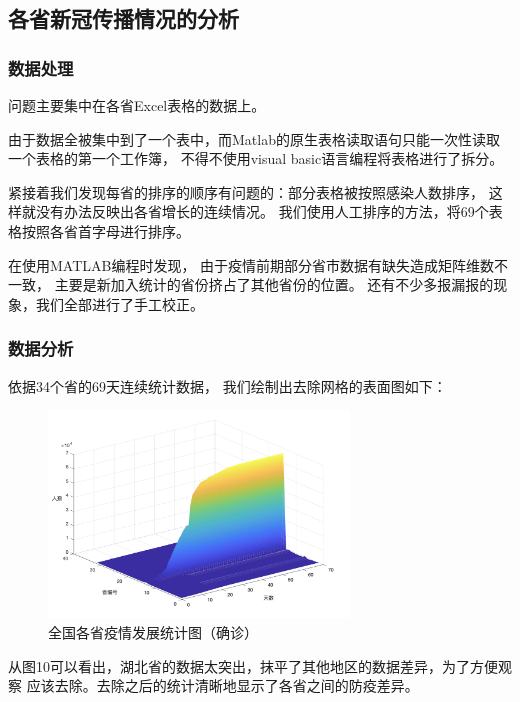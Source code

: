 \documentclass[UTF8]{ctexart}
\begin{document}
\subsection{各省新冠传播情况的分析}
\subsubsection{数据处理}
问题主要集中在各省Excel表格的数据上。
\\
\par 
由于数据全被集中到了一个表中，而Matlab的原生表格读取语句只能一次性读取一个表格的第一个工作簿，
不得不使用visual basic语言编程将表格进行了拆分。

\par 
紧接着我们发现每省的排序的顺序有问题的：部分表格被按照感染人数排序，
这样就没有办法反映出各省增长的连续情况。
我们使用人工排序的方法，将69个表格按照各省首字母进行排序。

\par 
在使用MATLAB编程时发现，
由于疫情前期部分省市数据有缺失造成矩阵维数不一致，
主要是新加入统计的省份挤占了其他省份的位置。
还有不少多报漏报的现象，我们全部进行了手工校正。


\subsubsection{数据分析}
\par 
依据34个省的69天连续统计数据，
我们绘制出去除网格的表面图如下：

\begin{figure}[htbp][H]
\centering
\includegraphics[width=8cm]{11.png} 
\caption{全国各省疫情发展统计图（确诊）}
\end{figure}
\par
从图10可以看出，湖北省的数据太突出，抹平了其他地区的数据差异，为了方便观察
应该去除。去除之后的统计清晰地显示了各省之间的防疫差异。
\end{document}
